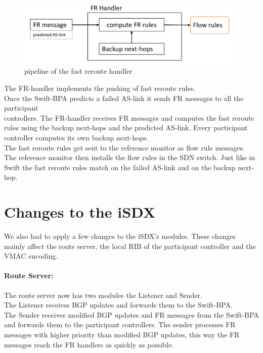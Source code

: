 \begin{figure}[h]
\center
\includegraphics[scale = 0.6]{Figures/design_fr_handler_cropped.pdf}
\caption{pipeline of the fast reroute handler}
\end{figure}

The FR-handler implements the pushing of fast reroute rules.  \\
Once the Swift-BPA predicts a failed AS-link it sends FR messages to all the participant \\ controllers.
The FR-handler receives FR messages and computes the fast reroute rules using the backup next-hops and the predicted AS-link. Every participant controller computes its own backup next-hops. \\ The fast reroute rules get sent to the reference monitor as flow rule messages. The reference monitor then installs the flow rules in the SDN switch. Just like in Swift the fast reroute rules match on the failed AS-link and on the backup next-hop.    

\newpage

\section{\label{chapter3:Changes_to_the_iSDX}Changes to the iSDX}

We also had to apply a few changes to the iSDX's modules. These changes mainly affect the route server, the local RIB of the participant controller and the VMAC encoding. 

\paragraph{\label{chapter3:Changes to the iSDX:route server}Route Server:}


The route server now has two modules the Listener and Sender. \\
The Listener receives BGP updates and forwards them to the Swift-BPA. \\
The Sender receives modified BGP updates and FR messages from the Swift-BPA and forwards them to the participant controllers. The sender processes FR messages with higher priority than modified BGP updates, this way the FR messages reach the FR handlers as quickly as possible. 

